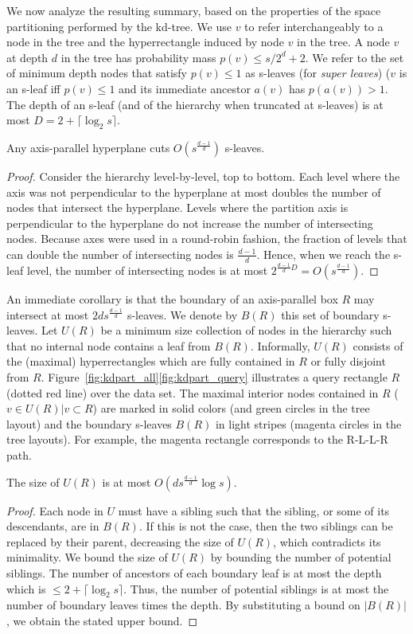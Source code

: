 \documentclass[11pt]{article}
\begin{document}
We now analyze the resulting summary, based on the properties of the
space partitioning performed by the kd-tree.
We use $v$ to refer interchangeably to a node in the tree and the  
hyperrectangle induced by node $v$ in the tree.  
A node $v$ at depth $d$ in the tree has probability mass
  $p(v)\leq s/2^d+2$.
 We refer to the set of minimum depth nodes that satisfy $p(v)\leq 1$
 as s-leaves (for {\em super leaves})
($v$ is an s-leaf iff $p(v)\leq 1$ and its immediate ancestor
 $a(v)$ has $p(a(v))>1$.  
The depth of an s-leaf (and of the hierarchy when truncated at
s-leaves) is at most $D=2+\lceil \log_2 s \rceil$.
\begin{lemma}
Any axis-parallel 
hyperplane cuts $O(s^{\frac{d-1}{d}})$ s-leaves.  
\label{lem:bsize}
\end{lemma}
\begin{proof}
Consider the hierarchy level-by-level, top to bottom.  
Each level where the axis was not perpendicular to the hyperplane at most
 doubles the number of nodes that intersect the hyperplane. 
Levels where the partition axis is perpendicular to the hyperplane do not
increase the number of intersecting nodes.
Because axes were used in a round-robin fashion, 
the fraction of levels that can double the number of intersecting nodes 
is $\frac{d-1}{d}$.
Hence, when we reach the s-leaf level, 
the number of intersecting nodes is at most  
$2^{\frac{d-1}{d} D} = O(s^{\frac{d-1}{d}})$.
\end{proof}
An immediate corollary is that
the boundary of an axis-parallel box $R$ may intersect at most $2d
s^{\frac{d-1}{d}}$ s-leaves. We denote by $B(R)$ this set of
boundary s-leaves. 
 Let $U(R)$ be a minimum size collection of nodes in the hierarchy 
such that no internal node contains a leaf from $B(R)$. 
Informally, $U(R)$ consists of the (maximal) hyperrectangles which
are fully contained in $R$ or fully disjoint from $R$.
Figure~\ref{fig:kdpart_all}\ref{fig:kdpart_query} illustrates a query rectangle $R$ (dotted red line) over the data set.
The maximal interior nodes contained in $R$  
($v\in U(R) | v\subset R$) are marked in solid
colors (and green circles in the tree layout) and the boundary s-leaves $B(R)$ in light stripes (magenta circles in the tree layouts).
For example, the magenta rectangle corresponds to the R-L-L-R path.
\begin{lemma}
\label{lem:usize}
The size of $U(R)$ is at most
 $O(d s^{\frac{d-1}{d}}\log s)$.
\end{lemma}
\begin{proof}
  Each node in $U$ must have a 
sibling such that the sibling, or some of its descendants, are in $B(R)$.
If this is not the case, then the two siblings can be replaced by their parent, decreasing the size of $U(R)$, which contradicts its minimality.
We bound the size of $U(R)$ by bounding the number of potential siblings.
The number of ancestors of each boundary leaf is at most the depth 
which is $\leq 2+\lceil \log_2 s\rceil$.  Thus, 
the number of potential siblings is at most the number of boundary leaves times the depth.  By substituting a bound on $|B(R)|$, we obtain the stated upper bound.
\end{proof}
\end{document}
